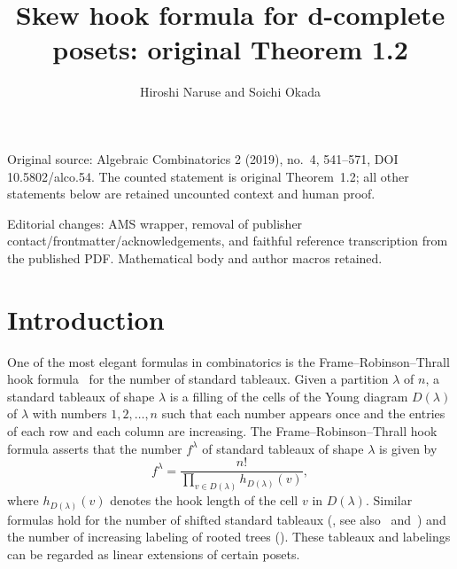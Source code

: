 \documentclass[10pt]{amsart}
\title{Skew hook formula for d-complete posets: original Theorem 1.2}
\author{Hiroshi Naruse and Soichi Okada}
\theoremstyle{definition}
\theoremstyle{remark}
\begin{document}
\maketitle
\noindent Original source: Algebraic Combinatorics 2 (2019), no.~4, 541--571,
DOI 10.5802/alco.54. The counted statement is original Theorem~1.2;
all other statements below are retained uncounted context and human proof.
\par\noindent Editorial changes: AMS wrapper, removal of publisher contact/frontmatter/acknowledgements,
and faithful reference transcription from the published PDF. Mathematical body and author macros retained.
\section{%
Introduction
}

One of the most elegant formulas in combinatorics is the Frame--Robinson--Thrall hook formula~\cite[Theorem~1]{FRT} for the number of standard tableaux.
Given a partition $\lambda$ of $n$, 
a standard tableaux of shape $\lambda$ is a filling of the cells of 
the Young diagram $D(\lambda)$ of $\lambda$ with numbers $1, 2, \dots, n$ 
such that each number appears once and the entries of each row and each column are increasing.
The Frame--Robinson--Thrall hook formula asserts that the number $f^\lambda$ of 
standard tableaux of shape $\lambda$ is given by
\begin{equation}
\label{eq:FRT-hook}
f^\lambda
 =
\frac{ n! }
 { \prod_{v \in D(\lambda)} h_{D(\lambda)}(v) },
\end{equation}
where $h_{D(\lambda)}(v)$ denotes the hook length of the cell $v$ in $D(\lambda)$.
Similar formulas hold for the number of shifted standard tableaux 
(\cite[5.1.4, Exercise~21]{Knu}, see also~\cite[\S~40]{Schur} and~\cite[Theorem~1]{T}) 
and the number of increasing labeling of rooted trees (\cite[5.1.4, Exercise~20]{Knu}).
These tableaux and labelings can be regarded as linear extensions of certain posets.
\end{document}
